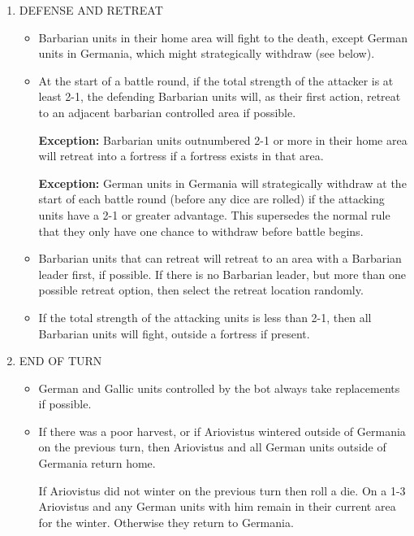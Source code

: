 \begin{enumerate}
  \item DEFENSE AND RETREAT
  \begin{itemize}
    \item Barbarian units in their home area will fight to the death, except German units in Germania, which might strategically withdraw (see below).
    \item At the start of a battle round, if the total strength of the attacker is at least 2-1, the defending Barbarian units will, as their first action, retreat to an adjacent barbarian controlled area if possible.
    
    \textbf{Exception:} Barbarian units outnumbered 2-1 or more in their home area will retreat into a fortress if a fortress exists in that area.
    
    \textbf{Exception:} German units in Germania will strategically withdraw at the start of each battle round (before any dice are rolled) if the attacking units have a 2-1 or greater advantage. This supersedes the normal rule that they only have one chance to withdraw before battle begins.
    \item Barbarian units that can retreat will retreat to an area with a Barbarian leader first, if possible. If there is no Barbarian leader, but more than one possible retreat option, then select the retreat location randomly.
    \item If the total strength of the attacking units is less than 2-1, then all Barbarian units will fight, outside a fortress if present.
  \end{itemize}
  
  \item END OF TURN
  \begin{itemize}
    \item German and Gallic units controlled by the bot always take replacements if possible.
    \item If there was a poor harvest, or if Ariovistus wintered outside of Germania on the previous turn, then Ariovistus and all German units outside of Germania return home.
    
    If Ariovistus did not winter on the previous turn then roll a die. On a 1-3 Ariovistus and any German units with him remain in their current area for the winter. Otherwise they return to Germania.
  \end{itemize}
\end{enumerate}

